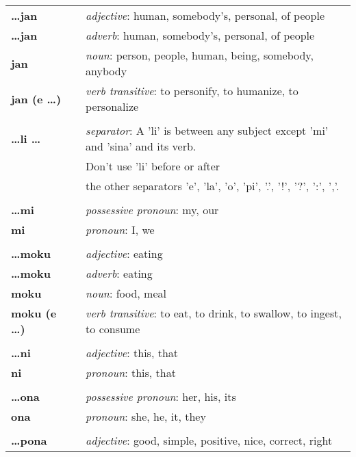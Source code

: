 \begin{supertabular}{p{2,5cm}|ll}
\textbf{\dots jan} && \textit{adjective}: human, somebody's, personal, of people \\ %
\textbf{\dots jan} && \textit{adverb}: human, somebody's, personal, of people \\ %
\textbf{jan} && \textit{noun}: person, people, human, being, somebody, anybody \\ %
\textbf{jan (e \dots)} && \textit{verb transitive}: to personify, to humanize, to personalize \\ %
 && \\ %
\textbf{\dots li \dots} && \textit{separator}: A 'li' is between any subject except 'mi' and 'sina' and its verb. \\ && Don't use 'li' before or after \\ && the other separators 'e', 'la', 'o', 'pi', '.', '!', '?', ':', ','. \\ %
 && \\ %
\textbf{\dots mi} && \textit{possessive pronoun}: my, our \\  %
\textbf{mi} && \textit{pronoun}: I, we  \\ %
 && \\ %
\textbf{\dots moku} && \textit{adjective}: eating \\ %
\textbf{\dots moku} && \textit{adverb}: eating \\ %
\textbf{moku} && \textit{noun}: food, meal \\ %
\textbf{moku (e \dots)} && \textit{verb transitive}: to eat, to drink, to swallow, to ingest, to consume \\ %
 && \\ %
\textbf{\dots ni} && \textit{adjective}: this, that \\ %
\textbf{ni} && \textit{pronoun}: this, that \\ %
 && \\ %
\textbf{\dots ona} && \textit{possessive pronoun}: her, his, its \\  %
\textbf{ona} && \textit{pronoun}: she, he, it, they \\ %
 && \\ %
\textbf{\dots pona} && \textit{adjective}: good, simple, positive, nice, correct, right \\ %

\end{supertabular}
